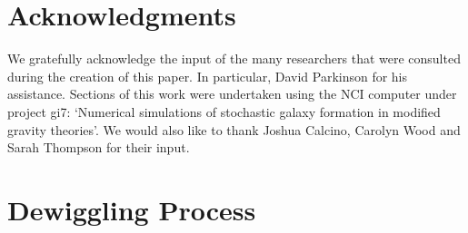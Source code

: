 \documentclass[iop,twocolappendix]{emulateapj}
\newcommand{\red}{\color{red}}
\begin{document}

\section*{Acknowledgments}

We gratefully acknowledge the input of the many researchers that were consulted during the creation of this paper. In particular, David Parkinson for his assistance. Sections of this work were undertaken using the NCI computer under project gi7: `Numerical simulations of stochastic galaxy formation in modified gravity theories'.   We  would also like to thank Joshua Calcino, Carolyn Wood and Sarah Thompson for their input.






\clearpage
\newpage
\phantom{df}
\pagebreak
\phantom{df}
\pagebreak
\appendix

	
	\section{Dewiggling Process} \label{app:dewiggle}
	
\end{document}
